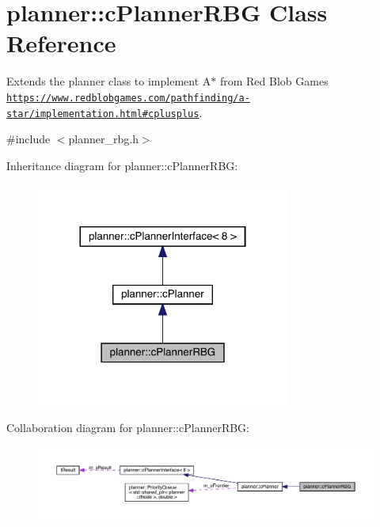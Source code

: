 \hypertarget{classplanner_1_1c_planner_r_b_g}{}\section{planner\+:\+:c\+Planner\+R\+BG Class Reference}
\label{classplanner_1_1c_planner_r_b_g}


Extends the planner class to implement A$\ast$ from Red Blob Games \href{https://www.redblobgames.com/pathfinding/a-star/implementation.html#cplusplus}{\tt https\+://www.\+redblobgames.\+com/pathfinding/a-\/star/implementation.\+html\#cplusplus}.  




{\ttfamily \#include $<$planner\+\_\+rbg.\+h$>$}



Inheritance diagram for planner\+:\+:c\+Planner\+R\+BG\+:\nopagebreak
\begin{figure}[H]
\begin{center}
\leavevmode
\includegraphics[width=236pt]{classplanner_1_1c_planner_r_b_g__inherit__graph}
\end{center}
\end{figure}


Collaboration diagram for planner\+:\+:c\+Planner\+R\+BG\+:\nopagebreak
\begin{figure}[H]
\begin{center}
\leavevmode
\includegraphics[width=350pt]{classplanner_1_1c_planner_r_b_g__coll__graph}
\end{center}
\end{figure}
